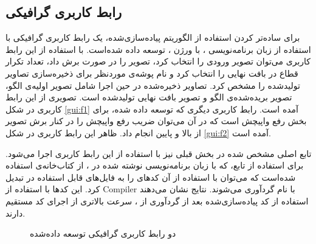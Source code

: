 \subsection{رابط کاربری گرافیکی}
\label{GUI}
برای ساده‌‌تر کردن استفاده از الگوریتم پیاده‌سازی‌شده، یک رابط کاربری گرافیکی با استفاده از زبان برنامه‌نویسی ، با ورژن ، توسعه داده شده‌است. با استفاده از این رابط کاربری می‌توان تصویر ورودی را انتخاب کرد، تصویر را در صورت برش داد، تعداد تکرار قطاع در بافت نهایی را انتخاب کرد و نام پوشه‌ی موردنظر برای ذخیره‌سازی تصاویر تولید‌شده را مشخص کرد. تصاویر ذخیره‌شده در حین اجرا شامل تصویر اولیه‌ی الگو، تصویر بریده‌شده‌ی الگو و تصویر بافت نهایی تولید‌شده است. تصویری از این رابط کاربری در شکل \ref{gui:f1} آمده است. رابط کاربری دیگری که توسعه‌ داده شده، برای بخش رفع واپیچش است که در آن می‌توان ضریب رفع واپیچش را در کنار برش تصویر از بالا و پایین انجام داد. ظاهر این رابط کاربری در شکل \ref{gui:f2} آمده است.

تابع اصلی مشخص شده در بخش قبلی نیز با استفاده از این رابط کاربری اجرا می‌شود. برای استفاده از تابع، که با زبان برنامه‌نویسی  نوشته شده در ، از کتاب‌خانه‌ی 
استفاده شده‌است که می‌توان با استفاده از آن کد‌های  را به فایل‌های قابل استفاده در  تبدیل کرد. این کد‌ها با استفاده از \gls{Compiler} با نام  گرد‌آوری می‌شوند. نتایج نشان می‌دهند استفاده از کد پیاده‌سازی‌شده بعد از گرد‌آوری از ، سرعت بالاتری از اجرای کد مستقیم  دارند.

\begin{figure}[htbp]
	\centering
	\qquad
	\caption{دو رابط کاربری گرافیکی توسعه داده‌شده}
	\label{gui}
\end{figure}






